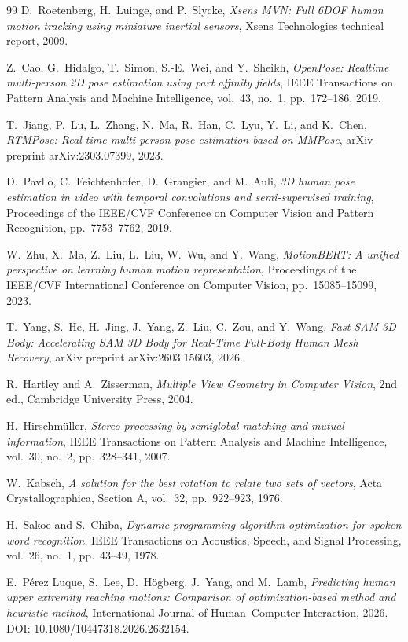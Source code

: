 \documentclass[12pt,a4paper]{article}
\begin{document}
\begin{thebibliography}{99}
D.~Roetenberg, H.~Luinge, and P.~Slycke,
\textit{Xsens MVN: Full 6DOF human motion tracking using miniature inertial sensors},
Xsens Technologies technical report, 2009.

Z.~Cao, G.~Hidalgo, T.~Simon, S.-E.~Wei, and Y.~Sheikh,
\textit{OpenPose: Realtime multi-person 2D pose estimation using part affinity fields},
IEEE Transactions on Pattern Analysis and Machine Intelligence,
vol.~43, no.~1, pp.~172--186, 2019.

T.~Jiang, P.~Lu, L.~Zhang, N.~Ma, R.~Han, C.~Lyu, Y.~Li, and K.~Chen,
\textit{RTMPose: Real-time multi-person pose estimation based on MMPose},
arXiv preprint arXiv:2303.07399, 2023.

D.~Pavllo, C.~Feichtenhofer, D.~Grangier, and M.~Auli,
\textit{3D human pose estimation in video with temporal convolutions and semi-supervised training},
Proceedings of the IEEE/CVF Conference on Computer Vision and Pattern Recognition, pp.~7753--7762, 2019.

W.~Zhu, X.~Ma, Z.~Liu, L.~Liu, W.~Wu, and Y.~Wang,
\textit{MotionBERT: A unified perspective on learning human motion representation},
Proceedings of the IEEE/CVF International Conference on Computer Vision, pp.~15085--15099, 2023.

T.~Yang, S.~He, H.~Jing, J.~Yang, Z.~Liu, C.~Zou, and Y.~Wang,
\textit{Fast SAM 3D Body: Accelerating SAM 3D Body for Real-Time Full-Body Human Mesh Recovery},
arXiv preprint arXiv:2603.15603, 2026.

R.~Hartley and A.~Zisserman,
\textit{Multiple View Geometry in Computer Vision},
2nd ed., Cambridge University Press, 2004.

H.~Hirschm{\"u}ller,
\textit{Stereo processing by semiglobal matching and mutual information},
IEEE Transactions on Pattern Analysis and Machine Intelligence,
vol.~30, no.~2, pp.~328--341, 2007.

W.~Kabsch,
\textit{A solution for the best rotation to relate two sets of vectors},
Acta Crystallographica, Section A, vol.~32, pp.~922--923, 1976.

H.~Sakoe and S.~Chiba,
\textit{Dynamic programming algorithm optimization for spoken word recognition},
IEEE Transactions on Acoustics, Speech, and Signal Processing,
vol.~26, no.~1, pp.~43--49, 1978.

E.~P{\'e}rez Luque, S.~Lee, D.~H{\"o}gberg, J.~Yang, and M.~Lamb,
\textit{Predicting human upper extremity reaching motions: Comparison of optimization-based method and heuristic method},
International Journal of Human--Computer Interaction, 2026.
DOI: 10.1080/10447318.2026.2632154.

\end{thebibliography}
\end{document}
